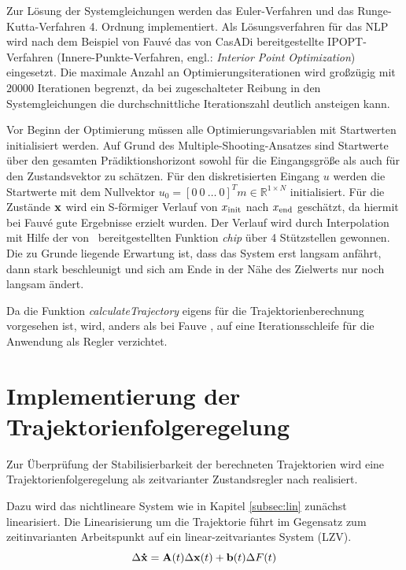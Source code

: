 Zur Lösung der Systemgleichungen werden das Euler-Verfahren und das Runge-Kutta-Verfahren 4. Ordnung implementiert. Als Lösungsverfahren für das NLP wird nach dem Beispiel von Fauvé \cite{fauve} das von CasADi bereitgestellte IPOPT-Verfahren (Innere-Punkte-Verfahren, engl.: \textit{Interior Point Optimization}) eingesetzt. Die maximale Anzahl an Optimierungsiterationen wird großzügig mit $20000$ Iterationen begrenzt, da bei zugeschalteter Reibung in den Systemgleichungen die durchschnittliche Iterationszahl deutlich ansteigen kann.

Vor Beginn der Optimierung müssen alle Optimierungsvariablen mit Startwerten initialisiert werden. Auf Grund des Multiple-Shooting-Ansatzes sind Startwerte über den gesamten Prädiktionshorizont sowohl für die Eingangsgröße als auch für den Zustandsvektor zu schätzen. Für den diskretisierten Eingang $u$ werden die Startwerte mit dem Nullvektor $u_0 = [0 \ 0 \ \ldots \ 0 ]^Tm\in \mathbb{R}^{1 \times N}$ initialisiert. Für die Zustände $\boldsymbol{\mathrm{x}}$ wird ein S-förmiger Verlauf von $x_{\mathrm{init}}$ nach $x_{\mathrm{end}}$ geschätzt, da hiermit bei Fauvé \cite{fauve} gute Ergebnisse erzielt wurden. Der Verlauf wird durch Interpolation mit Hilfe der von \Matlab\ bereitgestellten Funktion \textit{chip} über 4  Stützstellen gewonnen. Die zu Grunde liegende Erwartung ist, dass das System erst langsam anfährt, dann stark beschleunigt und sich am Ende in der Nähe des Zielwerts nur noch langsam ändert.

Da die Funktion \textit{calculateTrajectory} eigens für die Trajektorienberechnung vorgesehen ist, wird, anders als bei Fauve \cite{fauve}, auf eine Iterationsschleife für die Anwendung als Regler verzichtet.

\section{Implementierung der Trajektorienfolgeregelung}\label{sec:tfr}

Zur Überprüfung der Stabilisierbarkeit der berechneten Trajektorien wird eine Trajektorienfolgeregelung als zeitvarianter Zustandsregler nach \cite{matPrakt2} realisiert. 

Dazu wird das nichtlineare System wie in Kapitel \ref{subsec:lin} zunächst linearisiert. Die Linearisierung um die Trajektorie führt im Gegensatz zum zeitinvarianten Arbeitspunkt auf ein linear-zeitvariantes System (LZV).
	\[
	\Delta \boldsymbol{\mathrm{\dot{x}}} = {\boldsymbol{\mathrm{A}}}(t) \Delta \boldsymbol{\mathrm{x}}(t) + \boldsymbol{\mathrm{b}}(t) \Delta F(t)
\]

